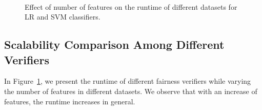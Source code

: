 \begin{figure}
\begin{center}
			\\
			
%			
			\caption{Effect of number of features on the runtime of different datasets for LR and SVM classifiers.}
			\label{fairness_fvgm_fig:time_vary_features}
			
			
			
		\end{center}
		
		
	\end{figure}
	
	
	\subsection{Scalability Comparison Among Different Verifiers}
	
	In Figure~\ref{fairness_fvgm_fig:time_vary_features}, we present the runtime of different fairness verifiers while varying the number of features in different datasets. We observe that with an increase of features, the runtime increases in general.
	
	
	
	
	
	
	
	
	
		
	
		

